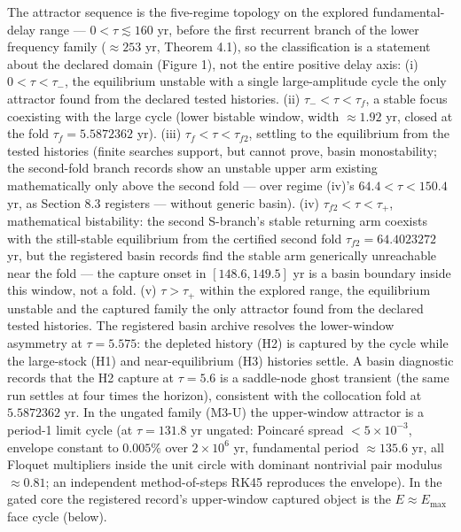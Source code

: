 \documentclass[11pt]{article}
\begin{document}
The attractor sequence is the five-regime topology on the explored
fundamental-delay range --- \(0 < \tau \lesssim 160\) yr, before the
first recurrent branch of the lower frequency family (\(\approx253\) yr,
Theorem 4.1), so the classification is a statement about the declared
domain (Figure 1), not the entire positive delay axis: (i)
\(0 < \tau < \tau_-\), the equilibrium unstable with a single
large-amplitude cycle the only attractor found from the declared tested
histories. (ii) \(\tau_- < \tau < \tau_f\), a stable focus coexisting
with the large cycle (lower bistable window, width \(\approx1.92\) yr,
closed at the fold \(\tau_f = 5.5872362\) yr). (iii)
\(\tau_f < \tau < \tau_{f2}\), settling to the equilibrium from the
tested histories (finite searches support, but cannot prove, basin
monostability; the second-fold branch records show an unstable upper arm
existing mathematically only above the second fold --- over regime
(iv)'s \(64.4 < \tau < 150.4\) yr, as Section 8.3 registers --- without
generic basin). (iv) \(\tau_{f2} < \tau < \tau_+\), mathematical
bistability: the second S-branch's stable returning arm coexists with
the still-stable equilibrium from the certified second fold
\(\tau_{f2} = 64.4023272\) yr, but the registered basin records find the
stable arm generically unreachable near the fold --- the capture onset
in \([148.6, 149.5]\) yr is a basin boundary inside this window, not a
fold. (v) \(\tau > \tau_+\) within the explored range, the equilibrium
unstable and the captured family the only attractor found from the
declared tested histories. The registered basin archive resolves the
lower-window asymmetry at \(\tau = 5.575\): the depleted history (H2) is
captured by the cycle while the large-stock (H1) and near-equilibrium
(H3) histories settle. A basin diagnostic records that the H2 capture at
\(\tau = 5.6\) is a saddle-node ghost transient (the same run settles at
four times the horizon), consistent with the collocation fold at
\(5.5872362\) yr. In the ungated family (M3-U) the upper-window
attractor is a period-1 limit cycle (at \(\tau = 131.8\) yr ungated:
Poincar\'e spread \(<5\times10^{-3}\), envelope constant to \(0.005\%\)
over \(2\times10^6\) yr, fundamental period \(\approx135.6\) yr, all
Floquet multipliers inside the unit circle with dominant nontrivial pair
modulus \(\approx0.81\); an independent method-of-steps RK45 reproduces
the envelope). In the gated core the registered record's upper-window
captured object is the \(E \approx E_{\max}\) face cycle (below).
\end{document}
